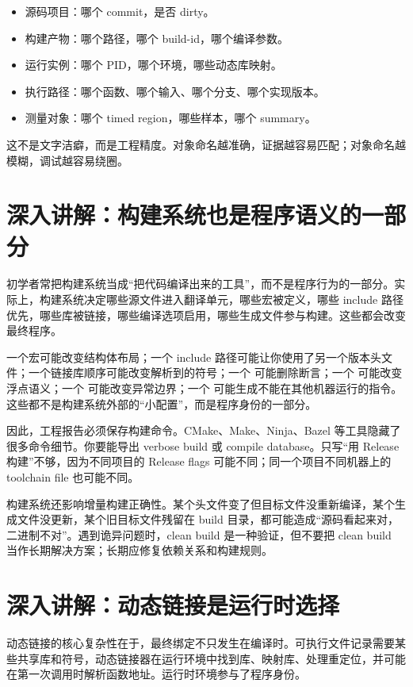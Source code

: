 \begin{itemize}
  \item 源码项目：哪个 commit，是否 dirty。
  \item 构建产物：哪个路径，哪个 build-id，哪个编译参数。
  \item 运行实例：哪个 PID，哪个环境，哪些动态库映射。
  \item 执行路径：哪个函数、哪个输入、哪个分支、哪个实现版本。
  \item 测量对象：哪个 timed region，哪些样本，哪个 summary。
\end{itemize}

这不是文字洁癖，而是工程精度。对象命名越准确，证据越容易匹配；对象命名越模糊，调试越容易绕圈。

\section{深入讲解：构建系统也是程序语义的一部分}

初学者常把构建系统当成“把代码编译出来的工具”，而不是程序行为的一部分。实际上，构建系统决定哪些源文件进入翻译单元，哪些宏被定义，哪些 include 路径优先，哪些库被链接，哪些编译选项启用，哪些生成文件参与构建。这些都会改变最终程序。

一个宏可能改变结构体布局；一个 include 路径可能让你使用了另一个版本头文件；一个链接库顺序可能改变解析到的符号；一个  可能删除断言；一个  可能改变浮点语义；一个  可能改变异常边界；一个  可能生成不能在其他机器运行的指令。这些都不是构建系统外部的“小配置”，而是程序身份的一部分。

因此，工程报告必须保存构建命令。CMake、Make、Ninja、Bazel 等工具隐藏了很多命令细节。你要能导出 verbose build 或 compile database。只写“用 Release 构建”不够，因为不同项目的 Release flags 可能不同；同一个项目不同机器上的 toolchain file 也可能不同。

构建系统还影响增量构建正确性。某个头文件变了但目标文件没重新编译，某个生成文件没更新，某个旧目标文件残留在 build 目录，都可能造成“源码看起来对，二进制不对”。遇到诡异问题时，clean build 是一种验证，但不要把 clean build 当作长期解决方案；长期应修复依赖关系和构建规则。

\section{深入讲解：动态链接是运行时选择}

动态链接的核心复杂性在于，最终绑定不只发生在编译时。可执行文件记录需要某些共享库和符号，动态链接器在运行环境中找到库、映射库、处理重定位，并可能在第一次调用时解析函数地址。运行时环境参与了程序身份。

